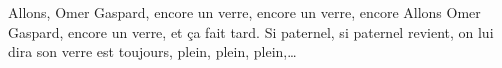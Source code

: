 \beginverse*
Allons, Omer Gaspard,
encore un verre,
encore un verre, encore
Allons Omer Gaspard,
encore un verre,
et ça fait tard.
\endverse
\beginverse*
Si paternel,
si paternel revient,
on lui dira
son verre est toujours,
plein, plein, plein,…
\endverse
\endsong 